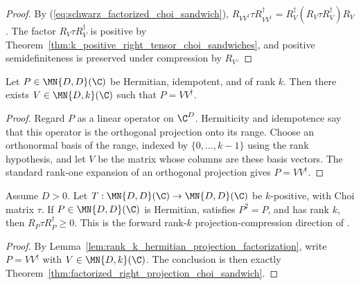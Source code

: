 \begin{proof}
    \leanok
    By (\ref{eq:schwarz_factorized_choi_sandwich}),
    $R_{VV^\dagger}\tau R_{VV^\dagger}^\dagger
        =R_V^\dagger(R_V\tau R_V^\dagger)R_V$.
    The factor $R_V\tau R_V^\dagger$ is positive by
    Theorem~\ref{thm:k_positive_right_tensor_choi_sandwiches}, and positive
    semidefiniteness is preserved under compression by $R_V$.
\end{proof}

\begin{lemma}
    \label{lem:rank_k_hermitian_projection_factorization}
    \leanok
    Let $P\in\MN{D,D}(\C)$ be Hermitian, idempotent, and of rank $k$.
    Then there exists $V\in\MN{D,k}(\C)$ such that $P=VV^\dagger$.
\end{lemma}

\begin{proof}
    \leanok
    Regard $P$ as a linear operator on $\C^D$. Hermiticity and idempotence say
    that this operator is the orthogonal projection onto its range. Choose an
    orthonormal basis of the range, indexed by $\{0,\ldots,k-1\}$ using the
    rank hypothesis, and let $V$ be the matrix whose columns are these basis
    vectors. The standard rank-one expansion of an orthogonal projection gives
    $P=VV^\dagger$.
\end{proof}

\begin{theorem}
    \label{thm:rank_k_right_projection_choi_sandwich_forward}
    \leanok
    Assume $D>0$. Let $T:\MN{D,D}(\C)\to\MN{D,D}(\C)$ be $k$-positive,
    with Choi matrix $\tau$. If $P\in\MN{D,D}(\C)$ is Hermitian, satisfies
    $P^2=P$, and has rank $k$, then $R_P\tau R_P^\dagger\geq0$.
    This is the forward rank-$k$ projection-compression direction of
    \cite[Chapter~3, Proposition~3.1]{Wolf2012Quantum}.
\end{theorem}

\begin{proof}
    \leanok
    By Lemma~\ref{lem:rank_k_hermitian_projection_factorization}, write
    $P=VV^\dagger$ with $V\in\MN{D,k}(\C)$. The conclusion is then exactly
    Theorem~\ref{thm:factorized_right_projection_choi_sandwich}.
\end{proof}

